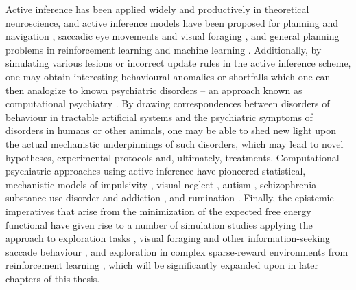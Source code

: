 Active inference has been applied widely and productively in theoretical neuroscience, and active inference models have been proposed for planning and navigation \citep{kaplan2018planning}, saccadic eye movements \citep{parr2017uncertainty,parr2018active,parr2018anatomy} and visual foraging \citep{parr2019computational,heins2020deep}, and general planning problems in reinforcement learning and machine learning \citep{ueltzhoffer_deep_2018,tschantz2020reinforcement,tschantz2020control,millidge_deep_2019}. Additionally, by simulating various lesions or incorrect update rules in the active inference scheme, one may obtain interesting behavioural anomalies or shortfalls which one can then analogize to known psychiatric disorders -- an approach known as computational psychiatry \citep{parr2019computational,cullen2018active}. By drawing correspondences between disorders of behaviour in tractable artificial systems and the psychiatric symptoms of disorders in humans or other animals, one may be able to shed new light upon the actual mechanistic underpinnings of such disorders, which may lead to novel hypotheses, experimental protocols and, ultimately, treatments. Computational psychiatric approaches using active inference have pioneered statistical, mechanistic models of impulsivity \citep{mirza2019impulsivity}, visual neglect \citep{parr2018computational}, autism \citep{lawson2014aberrant}, schizophrenia \citep{adams2012smooth} substance use disorder and addiction \citep{schwartenbeck2015optimal}, and rumination \citep{hesp2020sophisticated}. Finally, the epistemic imperatives that arise from the minimization of the expected free energy functional have given rise to a number of simulation studies applying the approach to exploration tasks \citep{schwartenbeck2013exploration,friston2015active,friston2017curiosity}, visual foraging and other information-seeking saccade behaviour \citep{heins2020deep,parr2017active}, and exploration in complex sparse-reward environments from reinforcement learning \citep{tschantz2020reinforcement}, which will be significantly expanded upon in later chapters of this thesis.

